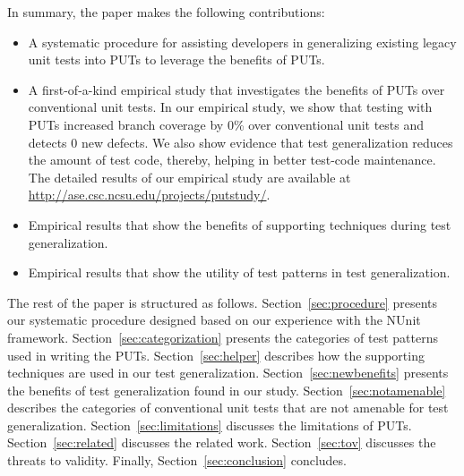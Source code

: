 In summary, the paper makes the following contributions:

\begin{itemize}
	\item A systematic procedure for assisting developers in generalizing existing legacy unit tests into PUTs to leverage the benefits of PUTs.
	\item A first-of-a-kind empirical study that investigates the benefits of PUTs over conventional unit tests. In our empirical study, we show that testing with PUTs increased branch coverage by $0$\% over conventional unit tests and detects $0$ new defects. We also show evidence that test generalization reduces the amount of test code, thereby, helping in better test-code maintenance. The detailed results of our empirical study are available at \url{http://ase.csc.ncsu.edu/projects/putstudy/}.	
	\item Empirical results that show the benefits of supporting techniques during test generalization. 
	\item Empirical results that show the utility of test patterns in test generalization.
\end{itemize}

The rest of the paper is structured as follows. 
Section~\ref{sec:procedure} presents our systematic procedure designed based on our experience with the NUnit framework.
Section~\ref{sec:categorization} presents the categories of test patterns used in writing the PUTs. 
Section~\ref{sec:helper} describes how the supporting techniques are used in our test generalization. 
Section~\ref{sec:newbenefits} presents the benefits of test generalization found in our study. 
Section~\ref{sec:notamenable} describes the categories of conventional unit tests that are not amenable for test generalization.
Section~\ref{sec:limitations} discusses the limitations of PUTs. Section~\ref{sec:related} discusses the related work. Section~\ref{sec:tov} discusses the threats to validity. Finally, Section~\ref{sec:conclusion} concludes.